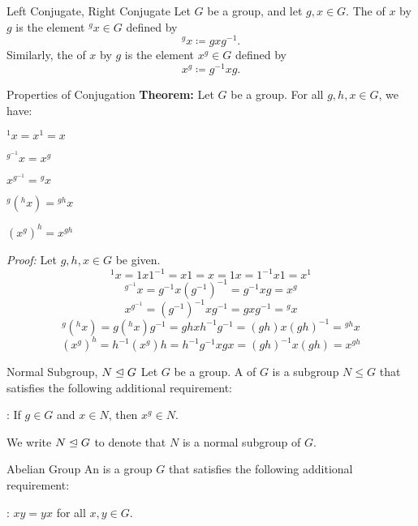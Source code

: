 \begin{dfnbox}{Left Conjugate, Right Conjugate}
	Let $G$ be a group, and let $g, x \in G$. The  of $x$ by $g$ is the element ${}^g x \in G$ defined by
	\[ {}^g x \coloneq g x g^{-1}. \]
	Similarly, the  of $x$ by $g$ is the element $x^g \in G$ defined by
	\[ x^g \coloneq g^{-1} x g. \]
\end{dfnbox}

\begin{thmbox}{Properties of Conjugation}
	\textbf{Theorem:} Let $G$ be a group. For all $g, h, x \in G$, we have:
	\begin{dfnitems}
		\item ${}^1 x = x^1 = x$
		\item ${}^{g^{-1}} x = x^g$
		\item $x^{g^{-1}} = {}^g x$
		\item ${}^{g} ({}^{h} x) = {}^{gh} x$
		\item $(x^g)^h = x^{gh}$
	\end{dfnitems}
	\tcblower
	\textit{Proof:} Let $g, h, x \in G$ be given.
	\[ {}^1 x = 1 x 1^{-1} = x1 = x = 1x = 1^{-1} x 1 = x^1 \]
	\[ {}^{g^{-1}} x = g^{-1} x (g^{-1})^{-1} = g^{-1} x g = x^g \]
	\[ x^{g^{-1}} = (g^{-1})^{-1} x g^{-1} = g x g^{-1} = {}^g x \]
	\[ {}^{g} ({}^{h} x) = g ({}^h x) g^{-1} = g h x h^{-1} g^{-1} = (gh) x (gh)^{-1} = {}^{gh} x \]
	\[ (x^g)^h = h^{-1} (x^g) h = h^{-1} g^{-1} x g x = (gh)^{-1} x (gh) = x^{gh} \]
\end{thmbox}

\begin{dfnbox}{Normal Subgroup, $N \trianglelefteq G$}
	Let $G$ be a group. A  of $G$ is a subgroup $N \le G$ that satisfies the following additional requirement:
	\begin{dfnitems}
		\item {}: If $g \in G$ and $x \in N$, then $x^g \in N$.
	\end{dfnitems}
	We write $N \trianglelefteq G$ to denote that $N$ is a normal subgroup of $G$.
\end{dfnbox}

\begin{dfnbox}{Abelian Group}
	An  is a group $G$ that satisfies the following additional requirement:
	\begin{dfnitems}
		\item {}: $x y = y x$ for all $x, y \in G$.
	\end{dfnitems}
\end{dfnbox}

